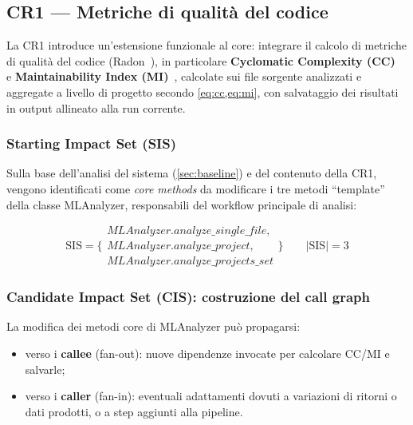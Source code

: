\documentclass[11pt,a4paper]{article}
\makeatletter
\newif\ifmark@prevlower
\def\mark@casebreak#1{%
  \ifcat\noexpand#1\relax
    \mark@prevlowerfalse
  \else
    \ifnum`#1=\uccode`#1\relax
      \ifmark@prevlower\allowbreak\fi
      \mark@prevlowerfalse
    \else
      \ifnum`#1=\lccode`#1\relax
        \mark@prevlowertrue
      \else
        \mark@prevlowerfalse
      \fi
    \fi
  \fi}
\def\mark@brk#1{%
  \ifx#1\mark@stop
    \let\mark@next\relax
  \else
    \mark@casebreak{#1}%
    #1%
    \ifx#1.\allowbreak\else
      \ifx#1\_\allowbreak\else
        \ifx#1/\allowbreak\else
          \ifx#1(\allowbreak\fi
        \fi
      \fi
    \fi
    \let\mark@next\mark@brk
  \fi
  \mark@next}
\def\mark@stop{\mark@stop}
\DeclareRobustCommand{\mark@code}[1]{%
  \ifmmode
    \text{\ttfamily\small\mark@prevlowerfalse\mark@brk#1\mark@stop}%
  \else
    {\ttfamily\small\mark@prevlowerfalse\mark@brk#1\mark@stop}%
  \fi}
\DeclareRobustCommand{\cls}[1]{\mark@code{#1}}
\DeclareRobustCommand{\meth}[1]{\mark@code{#1}}
\def\mark@code#1{#1}%
\def\cls#1{#1}%
\def\meth#1{#1}%
\newcommand{\SIS}{\textrm{SIS}}
\makeatother
\begin{document}
\subsection{CR1 --- Metriche di qualit\`a del codice}
\label{sec:ia-cr1}

La CR1 introduce un'estensione funzionale al core: integrare il calcolo di
metriche di qualit\`a del codice (Radon~\cite{radon}), in particolare
\textbf{Cyclomatic Complexity (CC)}~\cite{mccabe} e \textbf{Maintainability
Index (MI)}~\cite{colemanoman}, calcolate sui file sorgente analizzati e
aggregate a livello di progetto secondo \cref{eq:cc,eq:mi}, con salvataggio dei
risultati in output allineato alla run corrente.

\subsubsection{Starting Impact Set (SIS)}
\label{sec:ia-cr1-sis}

Sulla base dell'analisi del sistema (\cref{sec:baseline}) e del contenuto della
CR1, vengono identificati come \emph{core methods} da modificare i tre metodi
``template'' della classe \cls{MLAnalyzer}, responsabili del workflow principale
di analisi:

\begin{equation*}
  \SIS = \Big\{
    \begin{array}{l}
      \meth{MLAnalyzer.analyze\_single\_file},\\
      \meth{MLAnalyzer.analyze\_project},\\
      \meth{MLAnalyzer.analyze\_projects\_set}
    \end{array}
  \Big\}
  \qquad |\SIS| = 3
\end{equation*}

\subsubsection{Candidate Impact Set (CIS): costruzione del call graph}
\label{sec:ia-cr1-cis}

La modifica dei metodi core di \cls{MLAnalyzer} pu\`o propagarsi:

\begin{itemize}[nosep]
  \item verso i \textbf{callee} (fan-out): nuove dipendenze invocate per
    calcolare CC/MI e salvarle;
  \item verso i \textbf{caller} (fan-in): eventuali adattamenti dovuti a
    variazioni di ritorni o dati prodotti, o a step aggiunti alla pipeline.
\end{itemize}
\end{document}
